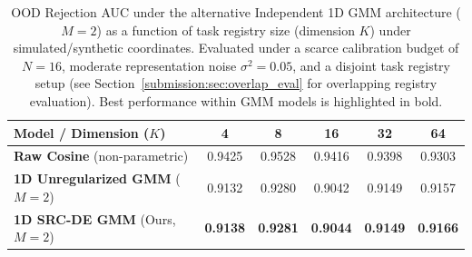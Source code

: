 \begin{table}[t]
\caption{OOD Rejection AUC under the alternative Independent 1D GMM architecture ($M=2$) as a function of task registry size (dimension $K$) under simulated/synthetic coordinates. Evaluated under a scarce calibration budget of $N=16$, moderate representation noise $\sigma^2=0.05$, and a disjoint task registry setup (see Section~\ref{submission:sec:overlap_eval} for overlapping registry evaluation). Best performance within GMM models is highlighted in bold.}
\label{submission:tab:one_d_results}
\vskip 0.15in
\begin{center}
\begin{small}
\begin{tabular}{lccccc}
\toprule
{\bf Model / Dimension ($K$)} & {\bf 4} & {\bf 8} & {\bf 16} & {\bf 32} & {\bf 64} \\
\midrule
{\bf Raw Cosine} (non-parametric) & 0.9425 & 0.9528 & 0.9416 & 0.9398 & 0.9303 \\
\midrule
{\bf 1D Unregularized GMM} ($M=2$) & 0.9132 & 0.9280 & 0.9042 & 0.9149 & 0.9157 \\
{\bf 1D SRC-DE GMM} (Ours, $M=2$) & \bf 0.9138 & \bf 0.9281 & \bf 0.9044 & \bf 0.9149 & \bf 0.9166 \\
\bottomrule
\end{tabular}
\end{small}
\end{center}
\vskip -0.1in
\end{table}

